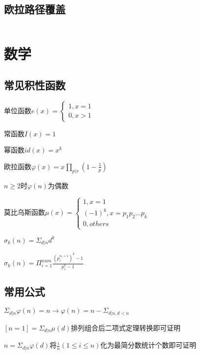 \documentclass[UTF8]{ctexart}
\begin{document}
\subsection{欧拉路径覆盖}
\inputminted{cpp}{graphtheory/欧拉路径覆盖.cpp}

\section{数学}

\subsection{常见积性函数}

单位函数$e(x)= \begin{cases}
	1,x=1 \\ 0,x>1
\end{cases}$\par

常函数$I(x)=1$\par

幂函数$id(x)=x^k$\par

欧拉函数$\varphi(x)=x\prod_{p|x}(1-\frac{1}{p})$\par

$n\geq 2$时$\varphi(n)$为偶数\par

莫比乌斯函数$\mu(x)=\begin{cases}
	1,x=1\\(-1)^k,x=p_1p_2...p_k \\ 0,others
\end{cases}$\par

$\sigma_k(n) = \Sigma_{d|n}d^k$\par

$\sigma_k(n)=\Pi_{i=1}^{num}\frac{(p_i^{a_i+1})^k-1}{p_i^k-1}$\par

\subsection{常用公式}

$\Sigma_{d|n} \varphi (n)=n\rightarrow \varphi(n)=n-\Sigma_{d|n,d<n}$\par

$[n=1]=\Sigma_{d|n}\mu(d)$排列组合后二项式定理转换即可证明\par

$n=\Sigma_{d|n}\varphi(d)$将$\frac{i}{n}(1\leq i\leq n)$化为最简分数统计个数即可证明\par
\end{document}
